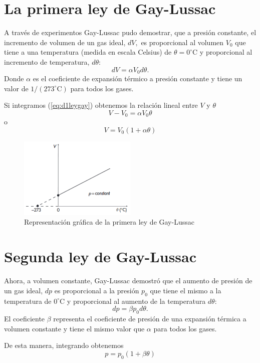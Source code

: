 \documentclass[openany]{book}
\begin{document}
\section{La primera ley de Gay-Lussac}
A través de experimentos Gay-Lussac pudo demostrar, que a presión constante, el incremento de volumen de un gas ideal, $dV,$ es proporcional al volumen $V_0$ que tiene a una temperatura (medida en escala Celsius) de $\theta=0^{\circ}\mathrm{C}$ y proporcional al incremento de temperatura, $d\theta$:
\begin{equation}\label{eq:d1leygay}
	dV=\alpha V_0d\theta.
\end{equation}
Donde $\alpha$ es el coeficiente de expansión térmico a presión constante y tiene un valor de $1/(273^\circ\mathrm{C})$ para todos los gases.\par
Si integramos (\ref{eq:d1leygay}) obtenemos la relación lineal entre $V$ y $\theta$
\begin{equation*}
	V-V_0=\alpha V_0\theta
\end{equation*}
o
\begin{equation}\label{eq:1leygay}
	V=V_0(1+\alpha\theta)
\end{equation}

\begin{figure}[htbp]
	\centering
	\includegraphics[width=0.5\textwidth]{img/1leygay.png}
	\caption{Representación gráfica de la primera ley de Gay-Lussac}
	\label{fig:1leygay}
\end{figure}

\section{Segunda ley de Gay-Lussac}
Ahora, a volumen constante, Gay-Lussac demostró que el aumento de presión de un gas ideal, $dp$ es proporcional a la presión $p_0$ que tiene el mismo a la temperatura de $0^\circ\mathrm{C}$ y proporcional al aumento de la temperatura $d\theta$:
\begin{equation*}
	dp=\beta p_0d\theta.
\end{equation*}
El coeficiente $\beta$ representa el coeficiente de presión de una expansión térmica a volumen constante y tiene el mismo valor que $\alpha$ para todos los gases.\par
De esta manera, integrando obtenemos
\begin{equation}\label{eq:2leygay}
	p=p_0(1+\beta\theta)
\end{equation}
\end{document}
